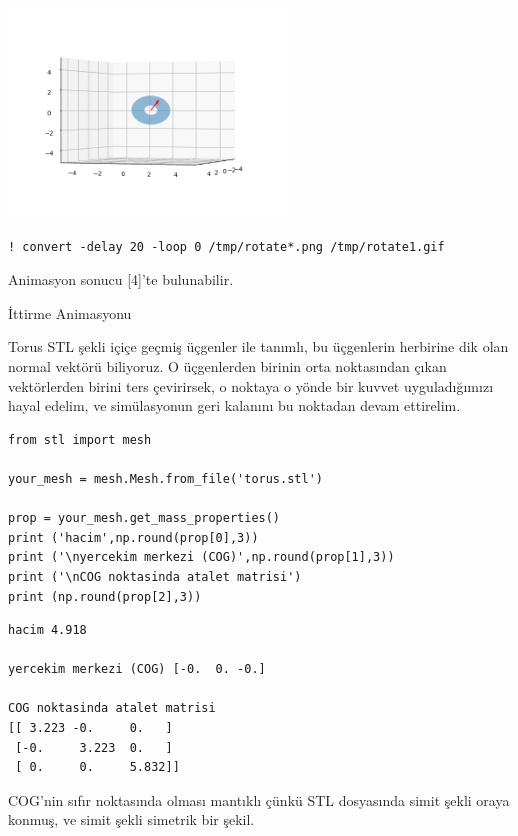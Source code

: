 \documentclass[12pt,fleqn]{article}\usepackage{../../common}
\begin{document}
\includegraphics[width=20em]{sim1/rotate_14.png}

\begin{verbatim}
! convert -delay 20 -loop 0 /tmp/rotate*.png /tmp/rotate1.gif
\end{verbatim}

Animasyon sonucu [4]'te bulunabilir.

İttirme Animasyonu

Torus STL şekli içiçe geçmiş üçgenler ile tanımlı, bu
üçgenlerin herbirine dik olan normal vektörü biliyoruz. O üçgenlerden birinin
orta noktasından çıkan vektörlerden birini ters çevirirsek, o noktaya o yönde
bir kuvvet uyguladığımızı hayal edelim, ve simülasyonun geri kalanını bu
noktadan devam ettirelim.

\begin{verbatim}
from stl import mesh

your_mesh = mesh.Mesh.from_file('torus.stl')

prop = your_mesh.get_mass_properties()
print ('hacim',np.round(prop[0],3))
print ('\nyercekim merkezi (COG)',np.round(prop[1],3))
print ('\nCOG noktasinda atalet matrisi')
print (np.round(prop[2],3))
\end{verbatim}

\begin{verbatim}
hacim 4.918

yercekim merkezi (COG) [-0.  0. -0.]

COG noktasinda atalet matrisi
[[ 3.223 -0.     0.   ]
 [-0.     3.223  0.   ]
 [ 0.     0.     5.832]]
\end{verbatim}

COG'nin sıfır noktasında olması mantıklı çünkü STL dosyasında simit şekli oraya
konmuş, ve simit şekli simetrik bir şekil.
\end{document}

